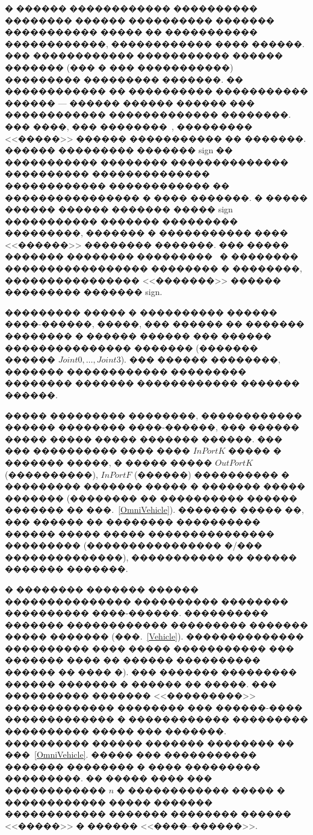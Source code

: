 \documentclass[12pt,a4paper]{article}
\begin{document}
� ������ ������������ ���������� �������� ������ ���������� ������� �����������
����� �� ����������� ������������, ������������ ���� ������. ��� ������������ 
����������� ������ ������� (��� � ��� �����������) ��������� ��������� �������. 
�� ������������ �� ���������� ����������� ������ --- ������ ������ ������ ��� 
������������ ������������� ��������. ��� ����, ��� ��������~\cite{Novozhilov}, 
��������� <<�����>> ������ ����������� �� �������. ������ ��������� ������� 
sign �� ����������� �������� �������������� ���������� �������������� 
������������ ������������ �� ���������������� � ���� �������. � ����� ������ 
������ ������� ����� sign ����������� ������� ��������� ���������, ������� � 
����������� ���� <<������>> �������� �������. ��� ����� ������� �������� 
���������~\cite{Novozhilov} � �������� ����������������� �������� � ��������, 
���������������� <<�������>> ������ ��������� ������� sign.

��������� ����� � ���������� ������ ����-������, �����, ��� ������ �� ������� 
�������� � ������ ������ ��� ������ ��������������� ������� (������� ������
$Joint0,\dots ,Joint3$). ��� ������ ��������, ������� ������������ ���������
�������� ������� ������������ ������� ������.

����� ��������� ��������, ������������ ������ �������� ����-������, ��� ������
����� ����� ����� ������� ������. ��� ��� ���������� ���� ���� $InPortK$ �����
� ������� �����, � ����� ����� $OutPortK$ (����������), $InPortF$ (������) 
���������� � ��������� ������� ����� � ������� ����� ������� (�������� �� 
���������� ������ ������� �� ���.~\ref{OmniVehicle}). ������� ����� ��, ��� 
������ �� �������� ���������� ������ ����� ����� ��������������� ���������
(���������������� �/��� ��������������), ����������� �� ������ ������� �������.

� �������� ������� ������ ��������������� ���������� �������� ���������� 
����-������. ���������� ������� ������������ ��������� ������� ����� �������
(���.~\ref{Vehicle}). �������������� ���������� ���� ����� ����������� ��� 
������� ���� �� ������ ���������� ������ �� ���� �). ��� ������� ��������� 
������ ������� � ������ �� �����. ��� ���������� ������� <<���������>> 
������������� �������� ��� ������-���� ������������� � ������������ ���������
���������� ����� ��� �������. ���������� ������ ������� �������� �� 
���~\ref{OmniVehicle}. ����� ��� ����������� ������� �������� � ���� ���������
���������. �� ����� ���� ��� ������������ $n$ � ������������ ����� � 
������������ ����� ������� ������������ ������� �������� ������ <<�����>> � 
������ <<����--������>>.
\end{document}
